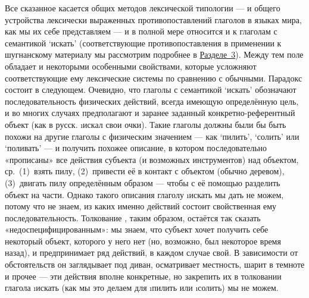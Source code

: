 Все сказанное касается общих методов лексической типологии — и общего устройства лексически выраженных противопоставлений глаголов в языках мира, как мы их себе представляем — и в полной мере относится и к глаголам с семантикой ‘искать’ (соответствующие противопоставления в применении к шугнанскому материалу мы рассмотрим подробнее в \hyperref[search-frames]{Разделе~3}). Между тем поле  обладает и некоторыми особенными свойствами, которые усложняют соответствующие ему лексические системы по сравнению с обычными. Парадокс  состоит в следующем. Очевидно, что глаголы с семантикой ‘искать’ обозначают последовательность физических действий, всегда имеющую определённую цель, и во многих случаях предполагают и заранее заданный конкретно-референтный объект (как в русск. \i{искал свои очки}). Такие глаголы должны были бы быть похожи на другие глаголы с физическим значением — как ‘пилить’, ‘солить’ или ‘поливать’ — и получить похожее описание, в котором последовательно «прописаны» все действия субъекта (и возможных инструментов) над объектом, ср.~(1)~взять пилу, (2)~привести её в контакт с объектом (обычно деревом), (3)~двигать пилу определённым образом — чтобы с её помощью разделить объект на части. Однако такого описания глаголу \i{искать} мы дать не можем, потому что не знаем, из каких именно действий состоит свойственная ему последовательность. Толкование , таким образом, остаётся так сказать «недоспецифицированным»: мы знаем, что субъект хочет получить себе некоторый объект, которого у него нет (но, возможно, был некоторое время назад), и предпринимает ряд действий, в каждом случае свой. В зависимости от обстоятельств он заглядывает под диван, осматривает местность, шарит в темноте и прочее — эти действия вполне конкретные, но закрепить их в толковании глагола \i{искать} (как мы это делаем для \i{пилить} или \i{солить}) мы не можем.

